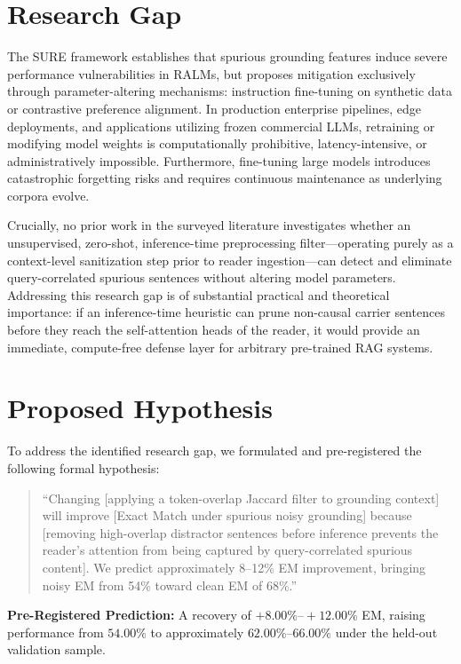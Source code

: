 \documentclass[conference]{IEEEtran}
\begin{document}
\section{Research Gap}
The SURE framework establishes that spurious grounding features induce severe performance vulnerabilities in RALMs, but proposes mitigation exclusively through parameter-altering mechanisms: instruction fine-tuning on synthetic data or contrastive preference alignment. In production enterprise pipelines, edge deployments, and applications utilizing frozen commercial LLMs, retraining or modifying model weights is computationally prohibitive, latency-intensive, or administratively impossible. Furthermore, fine-tuning large models introduces catastrophic forgetting risks and requires continuous maintenance as underlying corpora evolve.

Crucially, no prior work in the surveyed literature investigates whether an unsupervised, zero-shot, inference-time preprocessing filter---operating purely as a context-level sanitization step prior to reader ingestion---can detect and eliminate query-correlated spurious sentences without altering model parameters. Addressing this research gap is of substantial practical and theoretical importance: if an inference-time heuristic can prune non-causal carrier sentences before they reach the self-attention heads of the reader, it would provide an immediate, compute-free defense layer for arbitrary pre-trained RAG systems.

\section{Proposed Hypothesis}
To address the identified research gap, we formulated and pre-registered the following formal hypothesis:

\begin{quote}
``Changing [applying a token-overlap Jaccard filter to grounding context] will improve [Exact Match under spurious noisy grounding] because [removing high-overlap distractor sentences before inference prevents the reader's attention from being captured by query-correlated spurious content]. We predict approximately 8--12\% EM improvement, bringing noisy EM from 54\% toward clean EM of 68\%.''
\end{quote}

\textbf{Pre-Registered Prediction:} A recovery of $+8.00\%\text{--}+12.00\%$ EM, raising performance from $54.00\%$ to approximately $62.00\%\text{--}66.00\%$ under the held-out validation sample.
\end{document}

